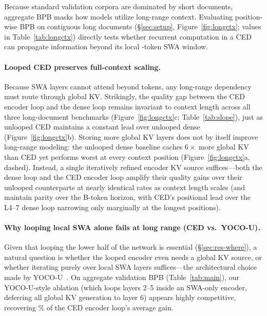 Because standard validation corpora are dominated by short documents, aggregate BPB masks how models utilize long-range context. Evaluating position-wise BPB on contiguous long documents (\S\ref{sec:setup}, Figure~\ref{fig:longctx}; values in Table~\ref{tab:longctx}) directly tests whether recurrent computation in a CED can propagate information beyond its local -token SWA window.

\paragraph{Looped CED preserves full-context scaling.} 
Because SWA layers cannot attend beyond  tokens, any long-range dependency must route through global KV. Strikingly, the quality gap between the CED encoder loop and the dense loop remains invariant to context length across all three long-document benchmarks (Figure~\ref{fig:longctx}c; Table~\ref{tab:slope}), just as unlooped CED maintains a constant lead over unlooped dense (Figure~\ref{fig:longctx}b). Storing more global KV layers does not by itself improve long-range modeling: the unlooped dense baseline caches $6\times$ more global KV than CED yet performs worst at every context position (Figure~\ref{fig:longctx}a, dashed). Instead, a single iteratively refined encoder KV source suffices—both the dense loop and the CED encoder loop amplify their quality gains over their unlooped counterparts at nearly identical rates as context length scales (and maintain parity over the B-token horizon, with CED's positional lead over the L4--7 dense loop narrowing only marginally at the longest positions).

\paragraph{Why looping local SWA alone fails at long range (CED vs.\ YOCO-U).} 
Given that looping the lower half of the network is essential (\S\ref{sec:res-where}), a natural question is whether the looped encoder even needs a global KV source, or whether iterating purely over local SWA layers suffices—the architectural choice made by YOCO-U~\citep{yocou}. On aggregate validation BPB (Table~\ref{tab:main}), our YOCO-U-style ablation (which loops layers 2--5 inside an SWA-only encoder, deferring all global KV generation to layer 6) appears highly competitive, recovering \% of the CED encoder loop's average gain. 

